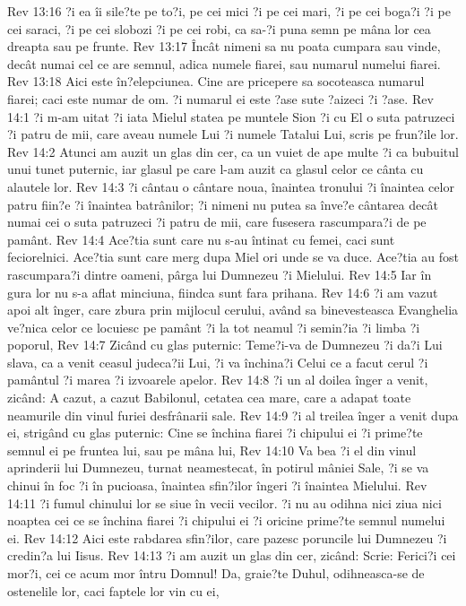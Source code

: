 Rev 13:16  ?i ea îi sile?te pe to?i, pe cei mici ?i pe cei mari, ?i pe cei boga?i ?i pe cei saraci, ?i pe cei slobozi ?i pe cei robi, ca sa-?i puna semn pe mâna lor cea dreapta sau pe frunte.
Rev 13:17  Încât nimeni sa nu poata cumpara sau vinde, decât numai cel ce are semnul, adica numele fiarei, sau numarul numelui fiarei.
Rev 13:18  Aici este în?elepciunea. Cine are pricepere sa socoteasca numarul fiarei; caci este numar de om. ?i numarul ei este ?ase sute ?aizeci ?i ?ase.
Rev 14:1  ?i m-am uitat ?i iata Mielul statea pe muntele Sion ?i cu El o suta patruzeci ?i patru de mii, care aveau numele Lui ?i numele Tatalui Lui, scris pe frun?ile lor.
Rev 14:2  Atunci am auzit un glas din cer, ca un vuiet de ape multe ?i ca bubuitul unui tunet puternic, iar glasul pe care l-am auzit ca glasul celor ce cânta cu alautele lor.
Rev 14:3  ?i cântau o cântare noua, înaintea tronului ?i înaintea celor patru fiin?e ?i înaintea batrânilor; ?i nimeni nu putea sa înve?e cântarea decât numai cei o suta patruzeci ?i patru de mii, care fusesera rascumpara?i de pe pamânt.
Rev 14:4  Ace?tia sunt care nu s-au întinat cu femei, caci sunt feciorelnici. Ace?tia sunt care merg dupa Miel ori unde se va duce. Ace?tia au fost rascumpara?i dintre oameni, pârga lui Dumnezeu ?i Mielului.
Rev 14:5  Iar în gura lor nu s-a aflat minciuna, fiindca sunt fara prihana.
Rev 14:6  ?i am vazut apoi alt înger, care zbura prin mijlocul cerului, având sa binevesteasca Evanghelia ve?nica celor ce locuiesc pe pamânt ?i la tot neamul ?i semin?ia ?i limba ?i poporul,
Rev 14:7  Zicând cu glas puternic: Teme?i-va de Dumnezeu ?i da?i Lui slava, ca a venit ceasul judeca?ii Lui, ?i va închina?i Celui ce a facut cerul ?i pamântul ?i marea ?i izvoarele apelor.
Rev 14:8  ?i un al doilea înger a venit, zicând: A cazut, a cazut Babilonul, cetatea cea mare, care a adapat toate neamurile din vinul furiei desfrânarii sale.
Rev 14:9  ?i al treilea înger a venit dupa ei, strigând cu glas puternic: Cine se închina fiarei ?i chipului ei ?i prime?te semnul ei pe fruntea lui, sau pe mâna lui,
Rev 14:10  Va bea ?i el din vinul aprinderii lui Dumnezeu, turnat neamestecat, în potirul mâniei Sale, ?i se va chinui în foc ?i în pucioasa, înaintea sfin?ilor îngeri ?i înaintea Mielului.
Rev 14:11  ?i fumul chinului lor se siue în vecii vecilor. ?i nu au odihna nici ziua nici noaptea cei ce se închina fiarei ?i chipului ei ?i oricine prime?te semnul numelui ei.
Rev 14:12  Aici este rabdarea sfin?ilor, care pazesc poruncile lui Dumnezeu ?i credin?a lui Iisus.
Rev 14:13  ?i am auzit un glas din cer, zicând: Scrie: Ferici?i cei mor?i, cei ce acum mor întru Domnul! Da, graie?te Duhul, odihneasca-se de ostenelile lor, caci faptele lor vin cu ei,
